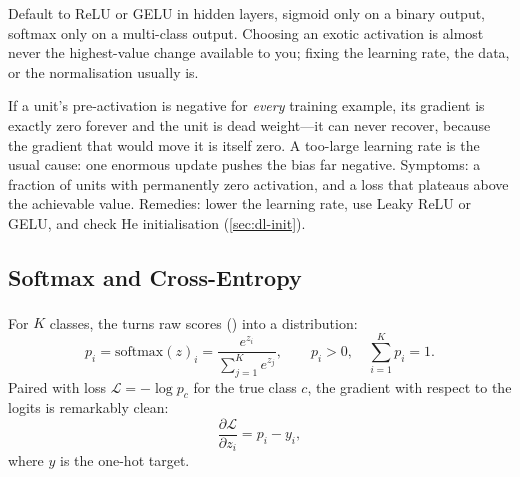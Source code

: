 \begin{engineernote}
Default to ReLU or GELU in hidden layers, sigmoid only on a binary output,
softmax only on a multi-class output. Choosing an exotic activation is almost
never the highest-value change available to you; fixing the learning rate,
the data, or the normalisation usually is.
\end{engineernote}

\begin{cautionbox}
If a unit's pre-activation is negative for \emph{every} training example, its
gradient is exactly zero forever and the unit is dead weight---it can never
recover, because the gradient that would move it is itself zero. A too-large
learning rate is the usual cause: one enormous update pushes the bias far
negative. Symptoms: a fraction of units with permanently zero activation, and a
loss that plateaus above the achievable value. Remedies: lower the learning
rate, use Leaky ReLU or GELU, and check He initialisation
(\cref{sec:dl-init}).
\end{cautionbox}

\subsection{Softmax and Cross-Entropy}

For $K$ classes, the  turns raw scores () into
a distribution\textsuperscript{\cite[][p.~18]{fleuretLittleBookDeep}}:
\begin{equation}
  p_i = \mathrm{softmax}(z)_i = \frac{e^{z_i}}{\sum_{j=1}^{K} e^{z_j}},
  \qquad p_i > 0,\quad \sum_{i=1}^{K} p_i = 1 .
  \label{eq:dl-softmax}
\end{equation}
Paired with  loss $\mathcal{L} = -\log p_{c}$ for the
true class $c$, the gradient with respect to the logits is remarkably clean:
\begin{equation}
  \frac{\partial \mathcal{L}}{\partial z_i} = p_i - y_i ,
  \label{eq:dl-softmax-grad}
\end{equation}
where $y$ is the one-hot target.

